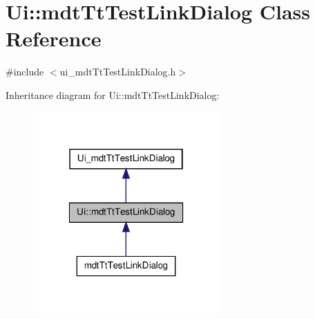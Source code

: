 \hypertarget{class_ui_1_1mdt_tt_test_link_dialog}{\section{Ui\-:\-:mdt\-Tt\-Test\-Link\-Dialog Class Reference}
\label{class_ui_1_1mdt_tt_test_link_dialog}
}


{\ttfamily \#include $<$ui\-\_\-mdt\-Tt\-Test\-Link\-Dialog.\-h$>$}



Inheritance diagram for Ui\-:\-:mdt\-Tt\-Test\-Link\-Dialog\-:
\nopagebreak
\begin{figure}[H]
\begin{center}
\leavevmode
\includegraphics[width=202pt]{class_ui_1_1mdt_tt_test_link_dialog__inherit__graph}
\end{center}
\end{figure}


